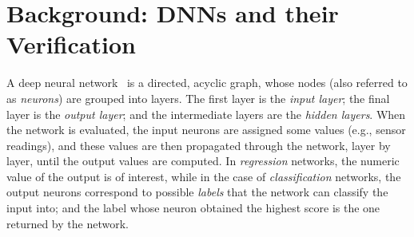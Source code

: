 \documentclass[10pt, conference, twocolumn, compsocconf]{IEEEtran}
\theoremstyle{remark}
\begin{document}
\section{Background: DNNs and their Verification}
\label{sec:background}

A deep neural network~\cite{GoBeCo16} is a directed, acyclic graph,
whose nodes (also referred to as \emph{neurons}) are grouped into
layers. The first layer is the \emph{input layer}; the final layer is
the \emph{output layer}; and the intermediate layers are the
\emph{hidden layers}. When the network is evaluated, the input neurons
are assigned some values (e.g., sensor readings), and these values are
then propagated through the network, layer by layer, until the output
values are computed. In \emph{regression} networks, the numeric value
of the output is of interest, while in the case of
\emph{classification} networks, the output
neurons correspond to possible \emph{labels} that the network can
classify the input into; and the label whose neuron obtained the
highest score is the one returned by the network.
\end{document}
